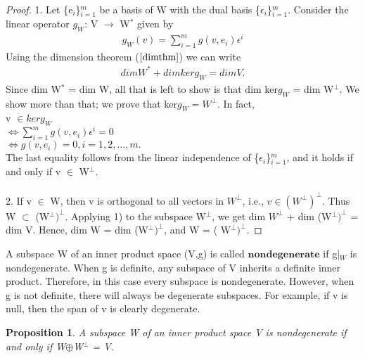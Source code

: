 \documentclass[12pt,a4paper]{article}
\newtheorem{prop}{Proposition}
\begin{document}
\begin{proof}
1. Let \{e$_i$\}$^m_{i=1}$  be a basis of W with the dual basis \{$\epsilon$$_i$\}$^m_{i=1}$. Consider the linear operator $g_W$: V $\to$ W$^*$ given by
\begin{eqnarray*}
g_W(v) = \sum_{i=1}^{m} g(v, e_i)\epsilon^i
\end{eqnarray*}
 Using the dimension theorem ($\ref{dimthm}$) we can write
 \begin{eqnarray*}
dim W^* + dim ker g_W = dim V.
\end{eqnarray*}
Since dim W$^*$ = dim W, all that is left to show is that dim ker$g_W$ = dim W$^\perp$. We show more than that; we prove that ker$g_W = W^\perp$. In fact,\\
v $\in ker g_W$ \\
$\Leftrightarrow \sum^m_{i=1} g(v, e_i) \epsilon^i = 0$\\
$\Leftrightarrow g(v, e_i) = 0, i = 1, 2, ... , m. $\\
The last equality follows from the linear independence of  \{$\epsilon$$_i$\}$^m_{i=1}$, and it holds if and only if v $\in$ W$^\perp$.\\\\
2. If v $\in$ W, then v is orthogonal to all vectors in $W^\perp$, i.e., $v \in (W^\perp)^\perp$. Thus W $\subset$ (W$^\perp)^\perp$. Applying 1) to the subspace
W$^\perp$, we get dim $W^\perp$ + dim (W$^\perp)^\perp$ = dim V. Hence, dim W = dim (W$^\perp)^\perp$, and W = ( W$^\perp)^\perp$.
\end{proof}
A subspace W of an inner product space (V,g) is called $\textbf{nondegenerate}$ if g|$_W$ is nondegenerate. When g is definite, any subspace of V inherits
a definite inner product. Therefore, in this case every subspace is nondegenerate. However, when g is not definite, there will always be degenerate
subspaces. For example, if v is null, then the span of v is clearly degenerate.

\begin{prop}
A subspace W of an inner product space V is nondegenerate if and only if W$\oplus$W$^\perp$ = V.
\end{prop}
\end{document}
